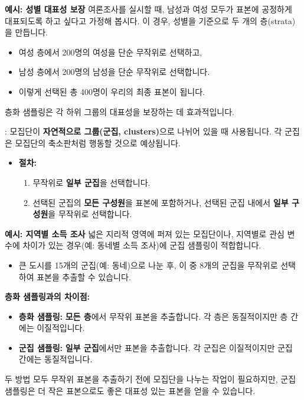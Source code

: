\documentclass[11pt,a4paper]{article}
\begin{document}
\begin{examplebox}
\textbf{예시: 성별 대표성 보장}
여론조사를 실시할 때, 남성과 여성 모두가 표본에 공정하게 대표되도록 하고 싶다고 가정해 봅시다. 이 경우, 성별을 기준으로 두 개의 층(strata)을 만듭니다.
\begin{itemize}
    \item 여성 층에서 200명의 여성을 단순 무작위로 선택하고,
    \item 남성 층에서 200명의 남성을 단순 무작위로 선택합니다.
    \item 이렇게 선택된 총 400명이 우리의 최종 표본이 됩니다.
\end{itemize}
층화 샘플링은 각 하위 그룹의 대표성을 보장하는 데 효과적입니다.
\end{examplebox}

\begin{tcolorbox}[mybox, title={확률 샘플링 기법 (3/3): 군집 샘플링 (Cluster Sampling)}]
: 모집단이 \textbf{자연적으로 그룹(군집, clusters)}으로 나뉘어 있을 때 사용됩니다. 각 군집은 모집단의 축소판처럼 행동할 것으로 예상됩니다.
\begin{itemize}
    \item \textbf{절차:}
    \begin{enumerate}
        \item 무작위로 \textbf{일부 군집}을 선택합니다.
        \item 선택된 군집의 \textbf{모든 구성원}을 표본에 포함하거나, 선택된 군집 내에서 \textbf{일부 구성원}을 무작위로 선택합니다.
    \end{enumerate}
\end{itemize}
\end{tcolorbox}

\begin{examplebox}
\textbf{예시: 지역별 소득 조사}
넓은 지리적 영역에 퍼져 있는 모집단이나, 지역별로 관심 변수에 차이가 있는 경우(예: 동네별 소득 조사)에 군집 샘플링이 적합합니다.
\begin{itemize}
    \item 큰 도시를 15개의 군집(예: 동네)으로 나눈 후, 이 중 8개의 군집을 무작위로 선택하여 표본을 추출할 수 있습니다.
\end{itemize}
\textbf{층화 샘플링과의 차이점:}
\begin{itemize}
    \item \textbf{층화 샘플링:} \textbf{모든 층}에서 무작위 표본을 추출합니다. 각 층은 동질적이지만 층 간에는 이질적입니다.
    \item \textbf{군집 샘플링:} \textbf{일부 군집}에서만 표본을 추출합니다. 각 군집은 이질적이지만 군집 간에는 동질적입니다.
\end{itemize}
두 방법 모두 무작위 표본을 추출하기 전에 모집단을 나누는 작업이 필요하지만, 군집 샘플링은 더 작은 표본으로도 좋은 대표성 있는 표본을 얻을 수 있습니다.
\end{examplebox}
\end{document}

